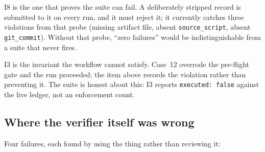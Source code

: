 \documentclass[11pt]{article}
\begin{document}
I8 is the one that proves the suite can fail. A deliberately stripped record
is submitted to it on every run, and it must reject it; it currently catches
three violations from that probe (missing artifact file, absent
\texttt{source\_script}, absent \texttt{git\_commit}). Without that probe,
``zero failures'' would be indistinguishable from a suite that never fires.

I3 is the invariant the workflow cannot satisfy. Case~12 overrode the
pre-flight gate and the run proceeded; the item above records the violation
rather than preventing it. The suite is honest about this: I3 reports
\texttt{executed: false} against the live ledger, not an enforcement count.

\subsection{Where the verifier itself was wrong}

Four failures, each found by using the thing rather than reviewing it:
\end{document}
